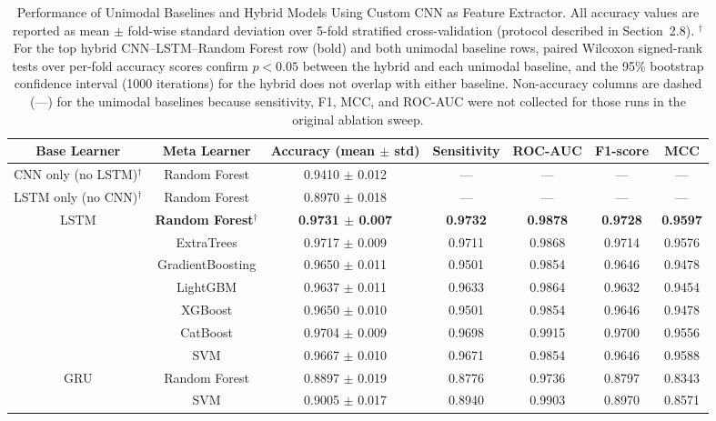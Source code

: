 \documentclass{elektr}
\begin{document}
\begin{table}[htbp]
	\centering
	\caption{Performance of Unimodal Baselines and Hybrid Models Using Custom CNN as Feature Extractor. All accuracy values are reported as mean $\pm$ fold-wise standard deviation over 5-fold stratified cross-validation (protocol described in Section~2.8). $^{\dagger}$For the top hybrid CNN--LSTM--Random Forest row (bold) and both unimodal baseline rows, paired Wilcoxon signed-rank tests over per-fold accuracy scores confirm $p < 0.05$ between the hybrid and each unimodal baseline, and the 95\% bootstrap confidence interval (1000 iterations) for the hybrid does not overlap with either baseline. Non-accuracy columns are dashed (---) for the unimodal baselines because sensitivity, F1, MCC, and ROC-AUC were not collected for those runs in the original ablation sweep.}
	\label{tab:custom cnn}
	\begin{tabular}{|c|c|c|c|c|c|c|}
		\hline
		\textbf{Base Learner} & \textbf{Meta Learner} & \textbf{Accuracy (mean $\pm$ std)} & \textbf{Sensitivity} & \textbf{ROC-AUC} & \textbf{F1-score} & \textbf{MCC} \\
		\hline
		CNN only (no LSTM)$^{\dagger}$  & Random Forest & 0.9410 $\pm$ 0.012 & --- & --- & --- & --- \\
		LSTM only (no CNN)$^{\dagger}$  & Random Forest & 0.8970 $\pm$ 0.018 & --- & --- & --- & --- \\
		\hline
		\multirow{7}{*}{LSTM}
		& \textbf{Random Forest}$^{\dagger}$ & \textbf{0.9731 $\pm$ 0.007} & \textbf{0.9732} & \textbf{0.9878} & \textbf{0.9728} & \textbf{0.9597} \\
		& ExtraTrees             & 0.9717 $\pm$ 0.009 & 0.9711 & 0.9868 & 0.9714 & 0.9576 \\
		& GradientBoosting       & 0.9650 $\pm$ 0.011 & 0.9501 & 0.9854 & 0.9646 & 0.9478 \\
		& LightGBM               & 0.9637 $\pm$ 0.011 & 0.9633 & 0.9864 & 0.9632 & 0.9454 \\
		& XGBoost                & 0.9650 $\pm$ 0.010 & 0.9501 & 0.9854 & 0.9646 & 0.9478 \\
		& CatBoost               & 0.9704 $\pm$ 0.009 & 0.9698 & 0.9915 & 0.9700 & 0.9556 \\
		& SVM                    & 0.9667 $\pm$ 0.010 & 0.9671 & 0.9854 & 0.9646 & 0.9588 \\
		\hline
		\multirow{4}{*}{GRU}
		& Random Forest          & 0.8897 $\pm$ 0.019 & 0.8776 & 0.9736 & 0.8797 & 0.8343 \\
		& SVM                    & 0.9005 $\pm$ 0.017 & 0.8940 & 0.9903 & 0.8970 & 0.8571 \\

\end{tabular}
\end{table}
\end{document}
